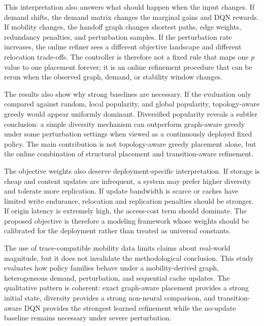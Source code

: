 This interpretation also answers what should happen when the input changes. If demand shifts, the demand matrix changes the marginal gains and DQN rewards. If mobility changes, the handoff graph changes shortest paths, edge weights, redundancy penalties, and perturbation samples. If the perturbation rate increases, the online refiner sees a different objective landscape and different relocation trade-offs. The controller is therefore not a fixed rule that maps one \(p\) value to one placement forever; it is an online refinement procedure that can be rerun when the observed graph, demand, or stability window changes.

The results also show why strong baselines are necessary. If the evaluation only compared against random, local popularity, and global popularity, topology-aware greedy would appear uniformly dominant. Diversified popularity reveals a subtler conclusion: a simple diversity mechanism can outperform graph-aware greedy under some perturbation settings when viewed as a continuously deployed fixed policy. %
The main contribution is not topology-aware greedy placement alone, but the online combination of structural placement and transition-aware refinement.

The objective weights also deserve deployment-specific interpretation. If storage is cheap and content updates are infrequent, a system may prefer higher diversity and tolerate more replication. If update bandwidth is scarce or caches have limited write endurance, relocation and replication penalties should be stronger. If origin latency is extremely high, the access-cost term should dominate. The proposed objective is therefore a modeling framework whose weights should be calibrated for the deployment rather than treated as universal constants.

The use of trace-compatible mobility data limits claims about real-world magnitude, but it does not invalidate the methodological conclusion. This study evaluates how policy families behave under a mobility-derived graph, heterogeneous demand, perturbation, and sequential cache updates. The qualitative pattern is coherent: exact graph-aware placement provides a strong initial state, diversity provides a strong non-neural comparison, and transition-aware DQN provides the strongest learned refinement while the no-update baseline remains necessary under severe perturbation.

